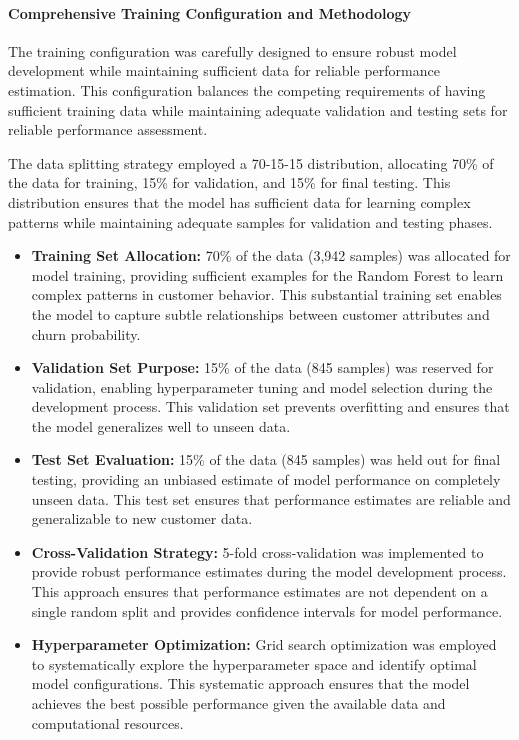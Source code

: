 \documentclass{article}
\begin{document}
\paragraph{Comprehensive Training Configuration and Methodology}

The training configuration was carefully designed to ensure robust model development while maintaining sufficient data for reliable performance estimation. This configuration balances the competing requirements of having sufficient training data while maintaining adequate validation and testing sets for reliable performance assessment.

The data splitting strategy employed a 70-15-15 distribution, allocating 70\% of the data for training, 15\% for validation, and 15\% for final testing. This distribution ensures that the model has sufficient data for learning complex patterns while maintaining adequate samples for validation and testing phases.

\begin{itemize}
    \item \textbf{Training Set Allocation:} 70\% of the data (3,942 samples) was allocated for model training, providing sufficient examples for the Random Forest to learn complex patterns in customer behavior. This substantial training set enables the model to capture subtle relationships between customer attributes and churn probability.
    
    \item \textbf{Validation Set Purpose:} 15\% of the data (845 samples) was reserved for validation, enabling hyperparameter tuning and model selection during the development process. This validation set prevents overfitting and ensures that the model generalizes well to unseen data.
    
    \item \textbf{Test Set Evaluation:} 15\% of the data (845 samples) was held out for final testing, providing an unbiased estimate of model performance on completely unseen data. This test set ensures that performance estimates are reliable and generalizable to new customer data.
    
    \item \textbf{Cross-Validation Strategy:} 5-fold cross-validation was implemented to provide robust performance estimates during the model development process. This approach ensures that performance estimates are not dependent on a single random split and provides confidence intervals for model performance.
    
    \item \textbf{Hyperparameter Optimization:} Grid search optimization was employed to systematically explore the hyperparameter space and identify optimal model configurations. This systematic approach ensures that the model achieves the best possible performance given the available data and computational resources.
\end{itemize}
\end{document}
